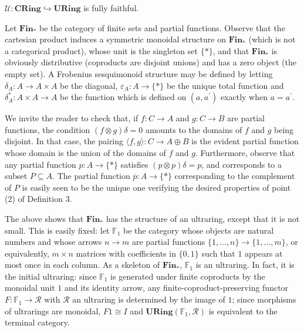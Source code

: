  
$\mathcal{U}:\mathbf{CRing}\hookrightarrow\mathbf{URing}$ is fully faithful.\par
 
 
 
 
Let $\mathbf{Fin}_{\ast}$ be the category of finite sets and partial functions. Observe that the cartesian product induces a symmetric monoidal structure on $\mathbf{Fin}_{\ast}$ (which is not a categorical product), whose unit is the singleton set $\{\ast\}$, and that $\mathbf{Fin}_{\ast}$ is obviously distributive (coproducts are disjoint unions) and has a zero object (the empty set). A Frobenius sesquimonoid structure may be defined by letting $\delta_{A}:A\to A\times A$ be the diagonal, $\varepsilon_{A}:A\to\{\ast\}$ be the unique total function and $\delta^{\ast}_{A}:A\times A\to A$ be the function which is defined on $(a,a^{\prime})$ exactly when $a=a^{\prime}$.\par
 
 
 
We invite the reader to check that, if $f:C\to A$ and $g:C\to B$ are partial functions, the condition $(f\otimes g)\delta=0$ amounts to the domains of $f$ and $g$ being disjoint. In that case, the pairing $\langle f,g\rangle:C\to A\oplus B$ is the evident partial function whose domain is the union of the domains of $f$ and $g$. Furthermore, observe that any partial function $p:A\to\{\ast\}$ satisfies $(p\otimes p)\delta=p$, and corresponds to a subset $P\subseteq A$. The partial function $\overline{p}:A\to\{\ast\}$ corresponding to the complement of $P$ is easily seen to be the unique one verifying the desired properties of point (2) of Definition 3.\par
 
 
 
The above shows that $\mathbf{Fin}_{\ast}$ has the structure of an ultraring, except that it is not small. This is easily fixed: let $\mathbb{F}_{1}$ be the category whose objects are natural numbers and whose arrows $n\to m$ are partial functions $\{1,\ldots,n\}\to\{1,\ldots,m\}$, or equivalently, $m\times n$ matrices with coefficients in $\{0,1\}$ such that $1$ appears at most once in each column. As a skeleton of $\mathbf{Fin}_{\ast}$, $\mathbb{F}_{1}$ is an ultraring. In fact, it is the initial ultraring: since $\mathbb{F}_{1}$ is generated under finite coproducts by the monoidal unit $1$ and its identity arrow, any finite-coproduct-preserving functor $F:\mathbb{F}_{1}\to\mathcal{R}$ with $\mathcal{R}$ an ultraring is determined by the image of $1$; since morphisms of ultrarings are monoidal, $F1\cong I$ and $\mathbf{URing}(\mathbb{F}_{1},\mathcal{R})$ is equivalent to the terminal category.\par
 
